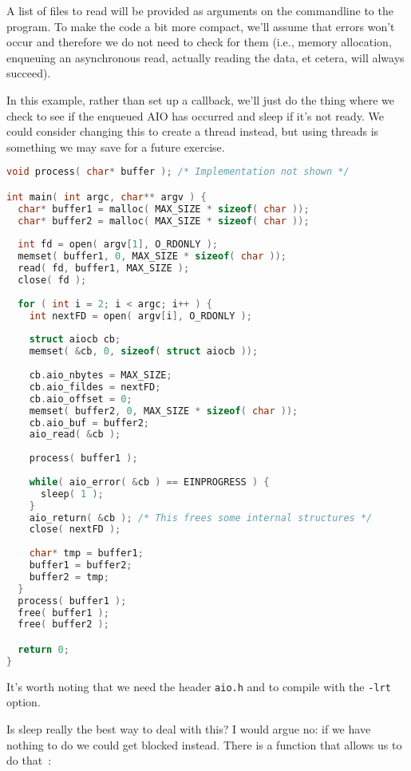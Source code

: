 A list of files to read will be provided as arguments on the commandline to the program. To make the code a bit more compact, we'll assume that errors won't occur and therefore we do not need to check for them (i.e., memory allocation, enqueuing an asynchronous read, actually reading the data, et cetera, will always succeed).

In this example, rather than set up a callback, we'll just do the thing where we check to see if the enqueued AIO has occurred and sleep if it's not ready. We could consider changing this to create a thread instead, but using threads is something we may save for a future exercise.

\begin{lstlisting}[language=C]
void process( char* buffer ); /* Implementation not shown */

int main( int argc, char** argv ) {
  char* buffer1 = malloc( MAX_SIZE * sizeof( char ));
  char* buffer2 = malloc( MAX_SIZE * sizeof( char ));
  
  int fd = open( argv[1], O_RDONLY );
  memset( buffer1, 0, MAX_SIZE * sizeof( char ));
  read( fd, buffer1, MAX_SIZE );
  close( fd );
  
  for ( int i = 2; i < argc; i++ ) {
    int nextFD = open( argv[i], O_RDONLY );
    
    struct aiocb cb;
    memset( &cb, 0, sizeof( struct aiocb ));
    
    cb.aio_nbytes = MAX_SIZE;
    cb.aio_fildes = nextFD;
    cb.aio_offset = 0;
    memset( buffer2, 0, MAX_SIZE * sizeof( char ));
    cb.aio_buf = buffer2;
    aio_read( &cb );
 
    process( buffer1 );
    
    while( aio_error( &cb ) == EINPROGRESS ) {
      sleep( 1 );
    }
    aio_return( &cb ); /* This frees some internal structures */
    close( nextFD );
    
    char* tmp = buffer1;
    buffer1 = buffer2;
    buffer2 = tmp;
  }
  process( buffer1 );
  free( buffer1 );
  free( buffer2 );

  return 0;
}
\end{lstlisting}

It's worth noting that we need the header \texttt{aio.h} and to compile with the \texttt{-lrt} option.

Is sleep really the best way to deal with this? I would argue no: if we have nothing to do we could get blocked instead. There is a function that allows us to do that~\cite{apunix}:

